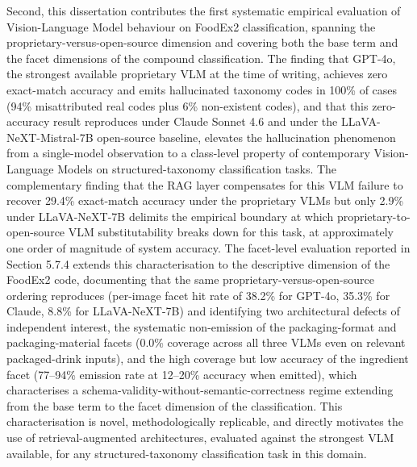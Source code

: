 Second, this dissertation contributes the first systematic empirical evaluation of Vision-Language Model behaviour on FoodEx2 classification, spanning the proprietary-versus-open-source dimension and covering both the base term and the facet dimensions of the compound classification. The finding that GPT-4o, the strongest available proprietary VLM at the time of writing, achieves zero exact-match accuracy and emits hallucinated taxonomy codes in 100\% of cases (94\% misattributed real codes plus 6\% non-existent codes), and that this zero-accuracy result reproduces under Claude Sonnet 4.6 and under the LLaVA-NeXT-Mistral-7B open-source baseline, elevates the hallucination phenomenon from a single-model observation to a class-level property of contemporary Vision-Language Models on structured-taxonomy classification tasks. The complementary finding that the RAG layer compensates for this VLM failure to recover 29.4\% exact-match accuracy under the proprietary VLMs but only 2.9\% under LLaVA-NeXT-7B delimits the empirical boundary at which proprietary-to-open-source VLM substitutability breaks down for this task, at approximately one order of magnitude of system accuracy. The facet-level evaluation reported in Section 5.7.4 extends this characterisation to the descriptive dimension of the FoodEx2 code, documenting that the same proprietary-versus-open-source ordering reproduces (per-image facet hit rate of 38.2\% for GPT-4o, 35.3\% for Claude, 8.8\% for LLaVA-NeXT-7B) and identifying two architectural defects of independent interest, the systematic non-emission of the packaging-format and packaging-material facets (0.0\% coverage across all three VLMs even on relevant packaged-drink inputs), and the high coverage but low accuracy of the ingredient facet (77--94\% emission rate at 12--20\% accuracy when emitted), which characterises a schema-validity-without-semantic-correctness regime extending from the base term to the facet dimension of the classification. This characterisation is novel, methodologically replicable, and directly motivates the use of retrieval-augmented architectures, evaluated against the strongest VLM available, for any structured-taxonomy classification task in this domain.

